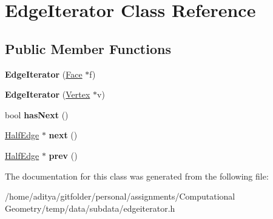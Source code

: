 \hypertarget{class_edge_iterator}{}\section{Edge\+Iterator Class Reference}
\label{class_edge_iterator}
\subsection*{Public Member Functions}
\begin{DoxyCompactItemize}
\item 
\hypertarget{class_edge_iterator_a42c84e570613393f79ee3e1fdd2f13f6}{}{\bfseries Edge\+Iterator} (\hyperlink{class_face}{Face} $\ast$f)\label{class_edge_iterator_a42c84e570613393f79ee3e1fdd2f13f6}

\item 
\hypertarget{class_edge_iterator_a1f52086a1008e760fda3895bc24f3d2c}{}{\bfseries Edge\+Iterator} (\hyperlink{class_vertex}{Vertex} $\ast$v)\label{class_edge_iterator_a1f52086a1008e760fda3895bc24f3d2c}

\item 
\hypertarget{class_edge_iterator_a7be7552c8044f3ef2cc0ea664ed8ee0b}{}bool {\bfseries has\+Next} ()\label{class_edge_iterator_a7be7552c8044f3ef2cc0ea664ed8ee0b}

\item 
\hypertarget{class_edge_iterator_a4a4389dc6c3a877568b0aa3e0af27006}{}\hyperlink{class_half_edge}{Half\+Edge} $\ast$ {\bfseries next} ()\label{class_edge_iterator_a4a4389dc6c3a877568b0aa3e0af27006}

\item 
\hypertarget{class_edge_iterator_a68b679de5f89bf54497c71cb719acb27}{}\hyperlink{class_half_edge}{Half\+Edge} $\ast$ {\bfseries prev} ()\label{class_edge_iterator_a68b679de5f89bf54497c71cb719acb27}

\end{DoxyCompactItemize}


The documentation for this class was generated from the following file\+:\begin{DoxyCompactItemize}
\item 
/home/aditya/gitfolder/personal/assignments/\+Computational Geometry/temp/data/subdata/edgeiterator.\+h\end{DoxyCompactItemize}
